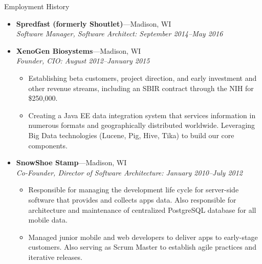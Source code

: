 \documentclass[11pt,oneside]{article}
\newenvironment{ressectionx}[1]{
	\vspace{4pt}
	{\fontfamily{phv}\selectfont\Large#1}
	\begin{itemize}[label={}]
	\vspace{3pt}
}{
	\end{itemize}
}
\newcommand{\ressubitem}[1]{
	\vspace{-1pt}
	\item \begin{flushleft} #1 \end{flushleft}
}
\newcommand{\resbigitem}[3]{
	\vspace{-5pt}
	\item
	\textbf{#1}---#2 \\
	\textit{#3}
}
\newenvironment{ressubsec}[3]{
	\resbigitem{#1}{#2}{#3}
	\vspace{-2pt}
	\begin{itemize}
}{
	\end{itemize}
}
\begin{document}
\begin{ressectionx}{Employment History}
\begin{ressubsec}{Spredfast (formerly Shoutlet)}{Madison, WI}{Software Manager, Software Architect: September 2014--May 2016}
	\end{ressubsec}

\begin{ressubsec}{XenoGen Biosystems}{Madison, WI}{Founder, CIO: August 2012--January 2015}
	\ressubitem{Establishing beta customers, project direction, and early investment and other revenue streams, including an SBIR contract through the NIH for \$250,000.}
	\ressubitem{Creating a Java EE data integration system that services information in numerous formats and geographically distributed worldwide. Leveraging Big Data technologies (Lucene, Pig, Hive, Tika) to build our core components.}	
	\end{ressubsec}
	

	\begin{ressubsec}{SnowShoe Stamp}{Madison, WI}{Co-Founder, Director of Software Architecture: January 2010--July 2012}
		\ressubitem{Responsible for managing the development life cycle for server-side software that provides and collects apps data. Also responsible for architecture and maintenance of centralized PostgreSQL database for all mobile data.  }
				\ressubitem{Managed junior mobile and web developers to deliver apps to early-stage customers. Also serving as Scrum Master to establish agile practices and iterative releases. }  
		
	\end{ressubsec}
	


\end{ressectionx}
\end{document}
